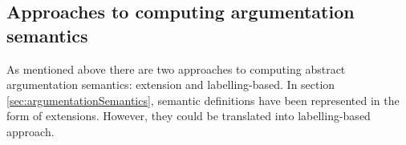 \subsection{Approaches to computing argumentation semantics}

As mentioned above there are two approaches to computing abstract argumentation semantics: extension and labelling-based. In section \ref{sec:argumentationSemantics}, semantic definitions have been represented in the form of extensions. However, they could be translated into labelling-based approach.